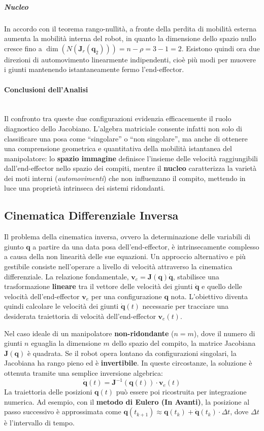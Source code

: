 \documentclass[11pt, a4paper]{report}
\begin{document}
\subparagraph{Nucleo}
In accordo con il teorema rango-nullità, a fronte della perdita di mobilità esterna aumenta la mobilità interna del robot, in quanto la dimensione dello spazio nullo cresce fino a $\dim(N(\bm{J}_r(\bm{q}_2))) = n - \rho = 3 - 1 = 2$. Esistono quindi ora due direzioni di automovimento linearmente indipendenti, cioè più modi per muovere i giunti mantenendo istantaneamente fermo l'end-effector.

\paragraph{Conclusioni dell'Analisi}
\mbox{}\\ %
Il confronto tra queste due configurazioni evidenzia efficacemente il ruolo diagnostico dello Jacobiano. L'algebra matriciale consente infatti non solo di classificare una posa come ``singolare'' o ``non singolare'', ma anche di ottenere una comprensione geometrica e quantitativa della mobilità istantanea del manipolatore: lo \textbf{spazio immagine} definisce l'insieme delle velocità raggiungibili dall'end-effector nello spazio dei compiti, mentre il \textbf{nucleo} caratterizza la varietà dei moti interni (\textit{automovimenti}) che non influenzano il compito, mettendo in luce una proprietà intrinseca dei sistemi ridondanti.

\newpage
\subsection{Cinematica Differenziale Inversa}
Il problema della cinematica inversa, ovvero la determinazione delle variabili di giunto \(\bm{q}\) a partire da una data posa dell'end-effector, è intrinsecamente complesso a causa della non linearità delle sue equazioni. Un approccio alternativo e più gestibile consiste nell'operare a livello di velocità attraverso la cinematica differenziale. La relazione fondamentale, \(\bm{v}_e = \bm{J}(\bm{q})\dot{\bm{q}}\), stabilisce una trasformazione \textbf{lineare} tra il vettore delle velocità dei giunti \(\dot{\bm{q}}\) e quello delle velocità dell'end-effector \(\bm{v}_e\) per una configurazione \(\bm{q}\) nota. L'obiettivo diventa quindi calcolare le velocità dei giunti \(\dot{\bm{q}}(t)\) necessarie per tracciare una desiderata traiettoria di velocità dell'end-effector \(\bm{v}_e(t)\).

Nel caso ideale di un manipolatore \textbf{non-ridondante} (\(n=m\)), dove il numero di giunti \(n\) eguaglia la dimensione \(m\) dello spazio del compito, la matrice Jacobiana \(\bm{J}(\bm{q})\) è quadrata. Se il robot opera lontano da configurazioni singolari, la Jacobiana ha rango pieno ed è \textbf{invertibile}. In queste circostanze, la soluzione è ottenuta tramite una semplice inversione algebrica:
\[
    \dot{\bm{q}}(t) = \bm{J}^{-1}(\bm{q}(t)) \cdot \bm{v}_e(t)
\]
La traiettoria delle posizioni \(\bm{q}(t)\) può essere poi ricostruita per integrazione numerica. Ad esempio, con il \textbf{metodo di Eulero (In Avanti)}, la posizione al passo successivo è approssimata come \(\bm{q}(t_{k+1}) \approx \bm{q}(t_k) + \dot{\bm{q}}(t_k) \cdot \Delta t\), dove \(\Delta t\) è l'intervallo di tempo.
\end{document}
